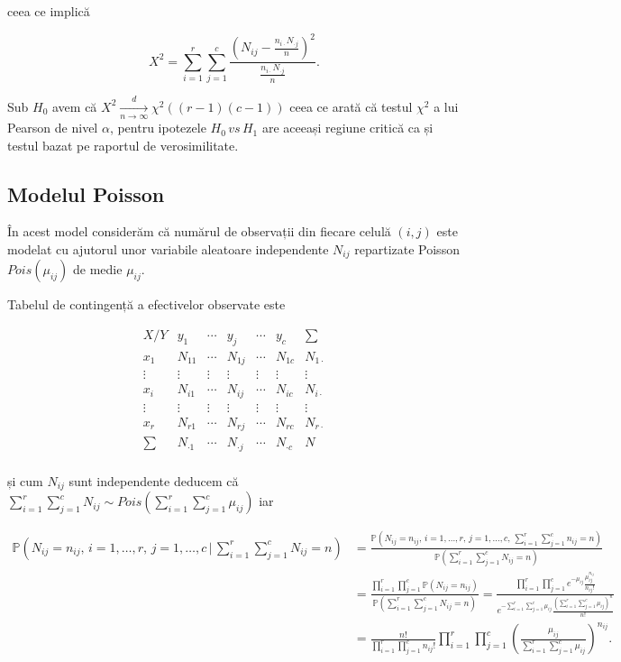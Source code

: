 \documentclass[]{article}
\begin{document}
ceea ce implică

\[
  X^2 = \sum_{i = 1}^{r}\sum_{j = 1}^{c}\frac{\left(N_{ij} - \frac{n_{i\cdot}N_{\cdot j}}{n}\right)^2}{\frac{n_{i\cdot}N_{\cdot j}}{n}}.
\]

Sub \(H_0\) avem că
\(X^2\underset{n\to\infty}{\overset{d}{\longrightarrow}} \chi^2((r-1)(c-1))\)
ceea ce arată că testul \(\chi^2\) a lui Pearson de nivel \(\alpha\),
pentru ipotezele \(H_0\,vs\,H_1\) are aceeași regiune critică ca și
testul bazat pe raportul de verosimilitate.

\subsection{Modelul Poisson}\label{modelul-poisson}

În acest model considerăm că numărul de observații din fiecare celulă
\((i,j)\) este modelat cu ajutorul unor variabile aleatoare independente
\(N_{ij}\) repartizate Poisson \(Pois(\mu_{ij})\) de medie \(\mu_{ij}\).

Tabelul de contingență a efectivelor observate este

\[
\begin{array}{c|ccccc|c}
  X / Y  &  y_1      & \cdots &  y_j     & \cdots &  y_c     & \sum\\
  \hline
  x_1      &  N_{11} & \cdots & N_{1j} & \cdots & N_{1c} & N_{1\cdot}\\
  \vdots & \vdots  & \vdots & \vdots & \vdots & \vdots & \vdots  \\
  x_i      &  N_{i1} & \cdots & N_{ij} & \cdots & N_{ic} & N_{i\cdot}\\
  \vdots & \vdots  & \vdots & \vdots & \vdots & \vdots & \vdots  \\
  x_r      &  N_{r1} & \cdots & N_{rj} & \cdots & N_{rc} & N_{r\cdot}\\
  \hline
  \sum   &  N_{\cdot 1} & \cdots & N_{\cdot j} & \cdots & N_{\cdot c} & N\\
\end{array}
\]

și cum \(N_{ij}\) sunt independente deducem că
\(\sum_{i = 1}^{r}\sum_{j = 1}^{c}N_{ij}\sim Pois(\sum_{i = 1}^{r}\sum_{j = 1}^{c}\mu_{ij})\)
iar

\scriptsize

\begin{align*}
  \mathbb{P}(N_{ij} = n_{ij},\,i = 1,\ldots, r,\, j = 1,\ldots,c\,|\,\sum_{i = 1}^{r}\sum_{j = 1}^{c}N_{ij} = n) &= \frac{\mathbb{P}(N_{ij} = n_{ij},\,i = 1,\ldots, r,\, j = 1,\ldots,c,\,\sum_{i = 1}^{r}\sum_{j = 1}^{c}n_{ij} = n)}{\mathbb{P}(\sum_{i = 1}^{r}\sum_{j = 1}^{c}N_{ij} = n)}\\
  &= \frac{\prod_{i = 1}^{r}\prod_{j = 1}^{c}\mathbb{P}(N_{ij} = n_{ij})}{\mathbb{P}(\sum_{i = 1}^{r}\sum_{j = 1}^{c}N_{ij} = n)} = \frac{\prod_{i = 1}^{r}\prod_{j = 1}^{c}e^{-\mu_{ij}}\frac{\mu_{ij}^{n_{ij}}}{n_{ij}!}}{e^{-\sum_{i = 1}^{r}\sum_{j = 1}^{c}\mu_{ij}}\frac{\left(\sum_{i = 1}^{r}\sum_{j = 1}^{c}\mu_{ij}\right)^{n}}{n!}}\\
  &= \frac{n!}{\prod_{i = 1}^{r}\prod_{j = 1}^{c}n_{ij}!}\prod_{i = 1}^{r}\prod_{j = 1}^{c}\left(\frac{\mu_{ij}}{\sum_{i = 1}^{r}\sum_{j = 1}^{c}\mu_{ij}}\right)^{n_{ij}}.
\end{align*}
\end{document}
